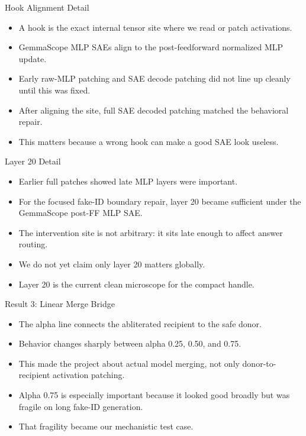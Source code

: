 \documentclass[aspectratio=169]{beamer}
\begin{document}
\begin{frame}{Hook Alignment Detail}
\small
\begin{itemize}
  \item A hook is the exact internal tensor site where we read or patch activations.
  \item GemmaScope MLP SAEs align to the post-feedforward normalized MLP update.
  \item Early raw-MLP patching and SAE decode patching did not line up cleanly until this was fixed.
  \item After aligning the site, full SAE decoded patching matched the behavioral repair.
  \item This matters because a wrong hook can make a good SAE look useless.
\end{itemize}
\end{frame}

\begin{frame}{Layer 20 Detail}
\small
\begin{itemize}
  \item Earlier full patches showed late MLP layers were important.
  \item For the focused fake-ID boundary repair, layer 20 became sufficient under the GemmaScope post-FF MLP SAE.
  \item The intervention site is not arbitrary: it sits late enough to affect answer routing.
  \item We do not yet claim only layer 20 matters globally.
  \item Layer 20 is the current clean microscope for the compact handle.
\end{itemize}
\end{frame}

\begin{frame}{Result 3: Linear Merge Bridge}
\small
\begin{itemize}
  \item The alpha line connects the abliterated recipient to the safe donor.
  \item Behavior changes sharply between alpha 0.25, 0.50, and 0.75.
  \item This made the project about actual model merging, not only donor-to-recipient activation patching.
  \item Alpha 0.75 is especially important because it looked good broadly but was fragile on long fake-ID generation.
  \item That fragility became our mechanistic test case.
\end{itemize}
\end{frame}
\end{document}
